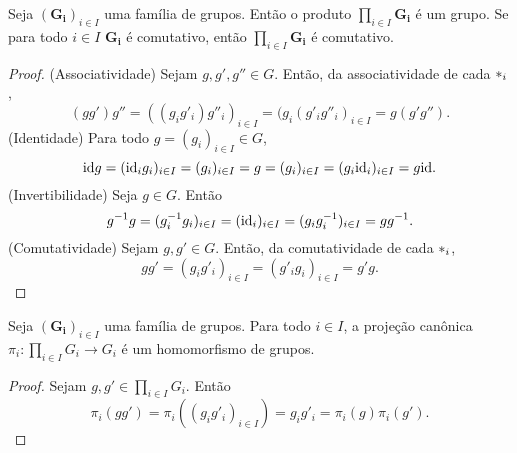\begin{prop}
\label{alge:prop.gru.prod}
Seja $(\bm{G_i})_{i \in I}$ uma família de grupos. Então o produto $\prod_{i \in I} \bm{G_i}$ é um grupo. Se para todo $i \in I$ $\bm{G_i}$ é comutativo, então $\prod_{i \in I} \bm{G_i}$ é comutativo.
\end{prop}
\begin{proof}
(Associatividade) Sejam $g,g',g'' \in G$. Então, da associatividade de cada $\ast_i$,
		\begin{equation*}
		(gg')g'' = ((g_ig'_i)g''_i)_{i \in I} = (g_i(g'_ig''_i)_{i \in I} = g(g'g'').
		\end{equation*}
	(Identidade) Para todo $g=(g_i)_{i \in I} \in G$,
		\begin{equation*}
		\mathrm{id} g = (\mathrm{id}_ig_i)_{i \in I} = (g_i)_{i \in I} = g = (g_i)_{i \in I} =(g_i\mathrm{id}_i)_{i \in I} = g\mathrm{id}.
		\end{equation*}
	(Invertibilidade) Seja $g \in G$. Então
	\begin{equation*}
	g^{-1} g = (g_i^{-1} g_i)_{i \in I} = (\mathrm{id}_i)_{i \in I} = (g_ig_i^{-1})_{i \in I} = gg^{-1}.
	\end{equation*}
	(Comutatividade) Sejam $g,g' \in G$. Então, da comutatividade de cada $ \ast _i$,
	\begin{equation*}
	gg' = (g_ig'_i)_{i \in I} = (g'_ig_i)_{i \in I} = g'g.
	\end{equation*}
\end{proof}

\begin{prop}
Seja $(\bm{G_i})_{i \in I}$ uma família de grupos. Para todo $i \in I$, a projeção canônica $\pi_i: \prod_{i \in I} G_i \to G_i$ é um homomorfismo de grupos.
\end{prop}
\begin{proof}
Sejam $g,g' \in \prod_{i \in I} G_i$. Então
	\begin{equation*}
	\pi_i(gg') = \pi_i((g_ig'_i)_{i \in I}) = g_ig'_i = \pi_i(g)\pi_i(g').
	\end{equation*}
\end{proof}

